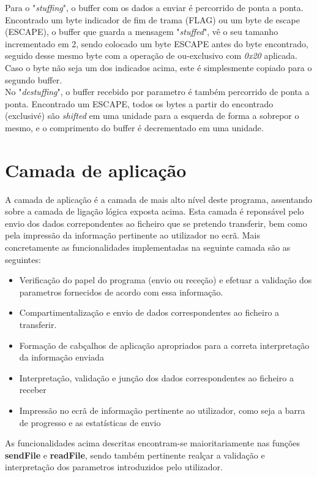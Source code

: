 \documentclass{article}
\begin{document}
Para o "\textit{stuffing}", o buffer com os dados a enviar é percorrido de ponta a ponta. Encontrado um byte indicador de fim de trama (FLAG) ou um byte de escape (ESCAPE), o buffer que guarda a mensagem "\textit{stuffed}", vê o seu tamanho incrementado em 2, sendo colocado um byte ESCAPE antes do byte encontrado, seguido desse mesmo byte com a operação de ou-exclusivo com \textit{0x20} aplicada. Caso o byte não seja um dos indicados acima, este é simplesmente copiado para o segundo buffer.\\
No "\textit{destuffing}", o buffer recebido por parametro é também percorrido de ponta a ponta. Encontrado um ESCAPE, todos os bytes a partir do encontrado (exclusivé) são \textit{shifted} em uma unidade para a esquerda de forma a sobrepor o mesmo, e o comprimento do buffer é decrementado em uma unidade.

\section{Camada de aplicação}
A camada de aplicação é a camada de mais alto nível deste programa, assentando sobre a camada de ligação lógica exposta acima. Esta camada é reponsável pelo envio dos dados correpondentes ao ficheiro que se pretendo transferir, bem como pela impressão da informação pertinente ao utilizador no ecrã. Mais concretamente as funcionalidades implementadas na seguinte camada são as seguintes:\\
\begin{itemize}
   \item Verificação do papel do programa (envio ou receção) e efetuar a validação dos parametros fornecidos de acordo com essa informação.
   \item Compartimentalização e envio de dados correspondentes ao ficheiro a transferir.
   \item Formação de cabçalhos de aplicação apropriados para a correta interpretação da informação enviada
   \item Interpretação, validação e junção dos dados correspondentes ao ficheiro a receber
   \item Impressão no ecrã de informação pertinente ao utilizador, como seja a barra de progresso e as estatísticas de envio
\end{itemize}

As funcionalidades acima descritas encontram-se maioritariamente nas funções \textbf{sendFile} e \textbf{readFile}, sendo também pertinente realçar a validação e interpretação dos parametros introduzidos pelo utilizador.
\end{document}
